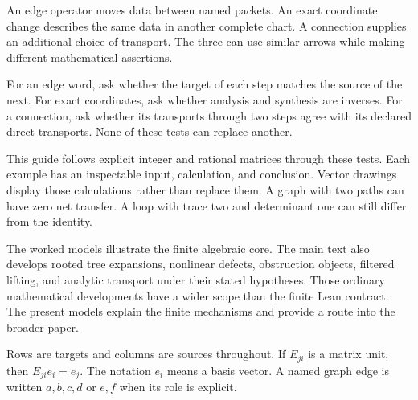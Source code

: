 An edge operator moves data between named packets. An exact coordinate change describes the same data in another complete chart. A connection supplies an additional choice of transport. The three can use similar arrows while making different mathematical assertions.


For an edge word, ask whether the target of each step matches the source of the next. For exact coordinates, ask whether analysis and synthesis are inverses. For a connection, ask whether its transports through two steps agree with its declared direct transports. None of these tests can replace another.

This guide follows explicit integer and rational matrices through these tests. Each example has an inspectable input, calculation, and conclusion. Vector drawings display those calculations rather than replace them. A graph with two paths can have zero net transfer. A loop with trace two and determinant one can still differ from the identity.

The worked models illustrate the finite algebraic core. The main text also develops rooted tree expansions, nonlinear defects, obstruction objects, filtered lifting, and analytic transport under their stated hypotheses. Those ordinary mathematical developments have a wider scope than the finite Lean contract. The present models explain the finite mechanisms and provide a route into the broader paper.


Rows are targets and columns are sources throughout. If $E_{ji}$ is a matrix unit, then $E_{ji}e_i=e_j$. The notation $e_i$ means a basis vector. A named graph edge is written $a,b,c,d$ or $e,f$ when its role is explicit.

